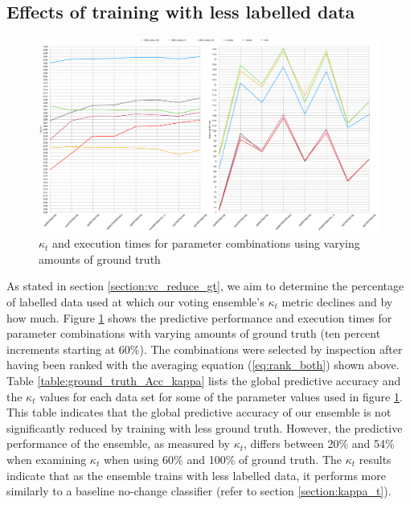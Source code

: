 \subsection{Effects of training with less labelled data}
\begin{figure}
  \includegraphics[width=\linewidth]{./images/chapter5/ground_truth_both}
\caption{\label{fig:ground_truth_drop}$\kappa_t$ and execution times for parameter combinations using varying amounts of ground truth}
\end{figure}

As stated in section \ref{section:vc_reduce_gt}, we aim to determine the percentage of labelled data used at which our voting ensemble's $\kappa_t$ metric declines and by how much. Figure \ref{fig:ground_truth_drop} shows the predictive performance and execution times for parameter combinations with varying amounts of ground truth (ten percent increments starting at 60\%). The combinations were selected by inspection after having been ranked with the averaging equation (\ref{eq:rank_both}) shown above. Table \ref{table:ground_truth_Acc_kappa} lists the global predictive accuracy and the $\kappa_t$ values for each data set for some of the parameter values used in figure \ref{fig:ground_truth_drop}. This table indicates that the global predictive accuracy of our ensemble is not significantly reduced by training with less ground truth. However, the predictive performance of the ensemble, as measured by $\kappa_t$, differs between 20\% and 54\% when examining $\kappa_t$ when using 60\% and 100\% of ground truth. The $\kappa_t$ results indicate that as the ensemble trains with less labelled data, it performs more similarly to a baseline no-change classifier (refer to section \ref{section:kappa_t}).

